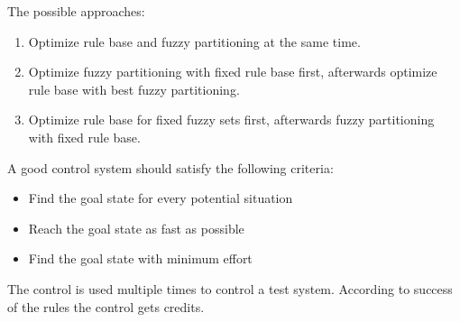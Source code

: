 \documentclass{article}
\begin{document}
The possible approaches:
\begin{enumerate}
    \item Optimize rule base and fuzzy partitioning at the same time.
    \item Optimize fuzzy partitioning with fixed rule base first, afterwards optimize rule base with
    best fuzzy partitioning.
    \item Optimize rule base for fixed fuzzy sets first, afterwards fuzzy partitioning with fixed rule
    base.
\end{enumerate}

A good control system should satisfy the following criteria:
\begin{itemize}
    \item Find the goal state for every potential situation
    \item Reach the goal state as fast as possible
    \item Find the goal state with minimum effort
\end{itemize}
The control is used multiple times to control a test system. According to success of the rules the control
gets credits.
\end{document}
